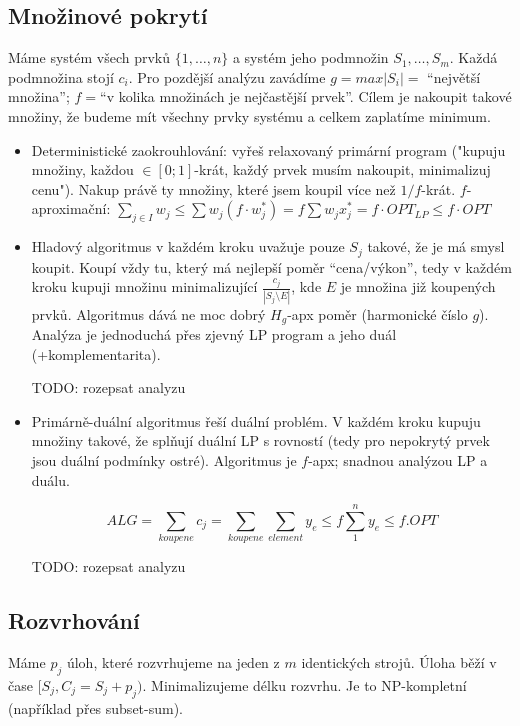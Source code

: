 \documentclass[a4paper,10pt,titlepage]{article} \usepackage[utf8]{inputenc}
\begin{document}
\subsection{Množinové pokrytí}
Máme systém všech prvků $\{1, \ldots, n\}$ a systém jeho podmnožin $S_1, \ldots,
S_m$. Každá podmnožina stojí $c_i$. Pro pozdější analýzu zavádíme $g=max|S_i|=$
``největší množina''; $f=$``v kolika množinách je nejčastější prvek''. Cílem je
nakoupit takové množiny, že budeme mít všechny prvky systému a celkem zaplatíme
minimum.

\begin{itemize}
\item	Deterministické zaokrouhlování: vyřeš relaxovaný primární
	program ("kupuju množiny, každou $\in[0;1]$-krát, každý prvek musím
	nakoupit, minimalizuj cenu").
	Nakup právě ty množiny, které jsem koupil více než $1/f$-krát.
	$f$-aproximační: $\sum_{j\in I}w_j\leq\sum w_j(f\cdot w_j^*)=f\sum w_j
	x_j^*=f\cdot OPT_{LP}\leq f\cdot OPT$


\item	Hladový algoritmus v každém kroku uvažuje pouze $S_j$ takové, že je má smysl koupit.
	Koupí vždy tu, který má nejlepší poměr ``cena/výkon'', tedy v každém kroku kupuji
	množinu minimalizující $\frac{c_j}{|S_j \setminus E|}$, kde $E$ je množina již koupených
	prvků. Algoritmus dává ne moc dobrý $H_g$-apx poměr (harmonické číslo $g$).
	Analýza je jednoduchá přes zjevný LP program a jeho duál (+komplementarita).

	TODO: rozepsat analyzu

\item	Primárně-duální algoritmus řeší duální problém. V každém kroku kupuju množiny takové,
	že splňují duální LP s rovností (tedy pro nepokrytý prvek jsou duální podmínky
	ostré). Algoritmus je $f$-apx; snadnou analýzou LP a duálu.

	$$
	ALG = \sum\limits_{koupene} c_j = \sum\limits_{koupene}\sum\limits_{element} y_e \leq f \sum\limits_{1}^{n} y_e \leq f.OPT
	$$

	TODO: rozepsat analyzu
\end{itemize}

\subsection{Rozvrhování}
Máme $p_j$ úloh, které rozvrhujeme na jeden z $m$ identických strojů.
Úloha běží v čase $[S_j, C_j=S_j+p_j)$. Minimalizujeme délku rozvrhu.
Je to NP-kompletní (například přes subset-sum).
\end{document}
